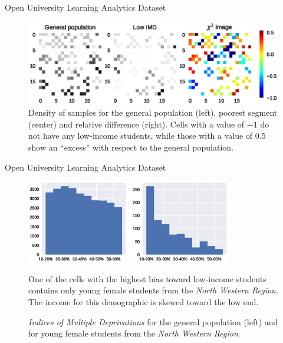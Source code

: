 \documentclass[10pt]{beamer}
\begin{document}
\begin{frame}{Open University Learning Analytics Dataset}
\begin{figure}[t]
    \centering
    \includegraphics[width=\textwidth]{imd}
    \caption[Comparing  density variations.]{Density of samples for the general population (left), poorest segment (center) and
    relative difference (right). Cells with a value of $-1$ do not have any low-income students,
    while those with a value of $0.5$ show an ``excess'' with respect to the general
    population.}
\end{figure}
    \cite{kuzilek_open_2017}
\end{frame}

\begin{frame}{Open University Learning Analytics Dataset}
\begin{figure}[htbp]
    \centering
    \includegraphics[width=0.8\textwidth]{imd_histogram}
    \caption[Histogram of the  for two populations.]{
        \emph{Indices of Multiple Deprivations} for the general population (left) and for
        young female students from the \emph{North Western Region}.
    }
    \begin{block}{}
    One of the cells with the highest bias toward low-income students
    contains only young female students from the \emph{North Western Region}.
    The income for this demographic is skewed toward the low end.
    \end{block}
\end{figure}
\end{frame}
\end{document}
